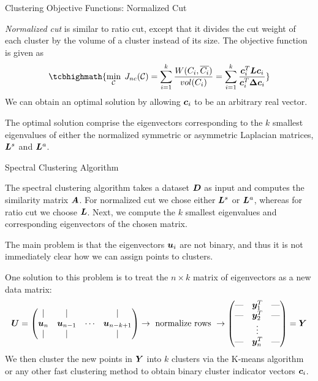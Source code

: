 \begin{frame}{Clustering Objective Functions: Normalized Cut}

{\em Normalized cut} is similar to
ratio cut, except that it divides the cut weight of each cluster
by the volume of a cluster instead of its size. The objective
function is given as
\begin{align*}
\tcbhighmath{
    \min_\cC \; J_{nc}(\cC) = \sum_{i=1}^k {W(C_i, \ol{C_i}) \over
    vol(C_i)} = \sum_{i=1}^k {\bc_i^T \bL \bc_i  \over
    \bc_i^T \bDelta \bc_i}
}
\end{align*}
We can obtain an optimal solution by allowing ${\boldsymbol c}_i$ to 
be an arbitrary real vector. 

\medskip
The optimal solution comprise the eigenvectors corresponding to the 
$k$ smallest eigenvalues of either the normalized symmetric or asymmetric
 Laplacian matrices, ${\boldsymbol L}^s$ and ${\boldsymbol L}^a$.
\end{frame}




\begin{frame}[fragile]{Spectral Clustering Algorithm}

The spectral clustering algorithm takes a dataset ${\boldsymbol D}$ as
input and computes the similarity matrix ${\boldsymbol A}$.  
For normalized cut we chose either ${\boldsymbol L}^s$
or ${\boldsymbol L}^a$, whereas for ratio cut we choose ${\boldsymbol L}$. 
Next, we
compute the $k$ smallest eigenvalues and corresponding 
eigenvectors of the chosen matrix.

\medskip
The main problem is that the eigenvectors ${\boldsymbol u}_i$
are not binary, and thus it is not immediately clear how we can
assign points to clusters. 

\medskip
One solution to this problem is to
treat the $n \times k$ matrix of eigenvectors as a new data matrix:
\begin{align*}
    {\boldsymbol U} = \begin{pmatrix} 
    | & | &  & | \\
    {\boldsymbol u}_n & {\boldsymbol u}_{n-1} & \cdots & {\boldsymbol u}_{n-k+1}\\
    | & | &  & | \\
     \end{pmatrix}
	\rightarrow
	\text{ normalize rows }
	\rightarrow
	\begin{pmatrix} 
    \mbox{---} & {\boldsymbol y}_1^T &\mbox{---}\\
    \mbox{---} & {\boldsymbol y}_2^T &\mbox{---}\\
    &\vdots&\\
    \mbox{---} & {\boldsymbol y}_n^T &\mbox{---}\\
     \end{pmatrix}
	= {\boldsymbol Y}
\end{align*}
We then cluster the new points in ${\boldsymbol Y}$ into $k$ clusters via
the K-means algorithm or any other fast clustering method to obtain
binary cluster indicator vectors ${\boldsymbol c}_i$.
\end{frame}



